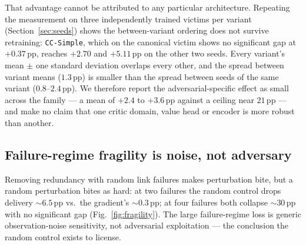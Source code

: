 \documentclass[10pt,journal,comsoc]{IEEEtran}
\begin{document}
That advantage cannot be attributed to any particular architecture. Repeating the
measurement on three independently trained victims per variant (Section~\ref{sec:seeds})
shows the between-variant ordering does not survive retraining: \texttt{CC-Simple}, which
on the canonical victim shows no significant gap at $+0.37$\,pp, reaches $+2.70$ and
$+5.11$\,pp on the other two seeds. Every variant's mean $\pm$ one standard deviation
overlaps every other, and the spread between variant means ($1.3$\,pp) is smaller than the
spread between seeds of the same variant ($0.8$--$2.4$\,pp). We therefore report the
adversarial-specific effect as small across the family --- a mean of $+2.4$ to $+3.6$\,pp
against a ceiling near $21$\,pp --- and make no claim that one critic domain, value head or
encoder is more robust than another.

\subsection{Failure-regime fragility is noise, not adversary}
Removing redundancy with random link failures makes perturbation bite, but a random
perturbation bites as hard: at two failures the random control drops delivery
${\sim}6.5$\,pp vs.\ the gradient's ${\sim}0.3$\,pp; at four failures both collapse
$\sim$$30$\,pp with no significant gap (Fig.~\ref{fig:fragility}). The large
failure-regime loss is generic observation-noise sensitivity, not adversarial
exploitation --- the conclusion the random control exists to license.
\end{document}
